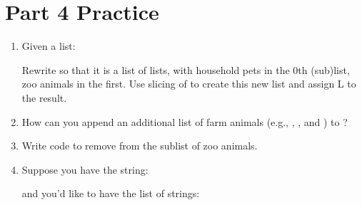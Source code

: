 \documentclass[letterpaper,10pt,english]{sphinxmanual}
\begin{document}
\section{Part 4 Practice}
\label{\detokenize{lecture_notes/lec10_lists2:part-4-practice}}\begin{enumerate}
\def\theenumi{\arabic{enumi}}
\def\labelenumi{\theenumi .}
\makeatletter\def\p@enumii{\p@enumi \theenumi .}\makeatother
\item {} 
Given a list:

\begin{sphinxVerbatim}[commandchars=\\\{\}]
  \PYG{p}{[}   \PYG{p}{]}
\end{sphinxVerbatim}

Rewrite  so that it is a list of lists, with household pets in
the 0th (sub)list, zoo animals in the first. Use slicing of
 to create this new list and assign L to the result.

\item {} 
How can you append an additional list of farm animals (e.g.,
, , and ) to ?

\item {} 
Write code to remove  from the sublist of zoo animals.

\item {} 
Suppose you have the string:

\begin{sphinxVerbatim}[commandchars=\\\{\}]
  
\end{sphinxVerbatim}

and you’d like to have the list of strings:

\begin{sphinxVerbatim}[commandchars=\\\{\}]
  \PYG{p}{[}   \PYG{p}{]}
\end{sphinxVerbatim}


\end{enumerate}
\end{document}
